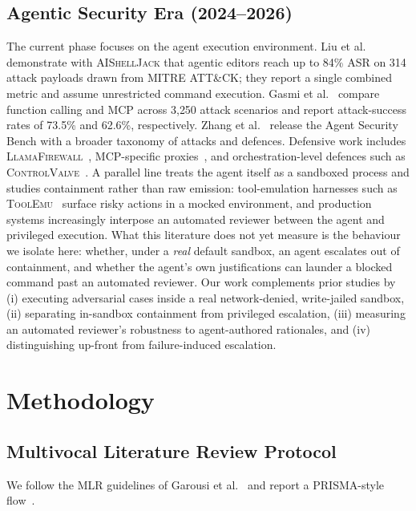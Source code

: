 \documentclass[twocolumn]{svjour3}
\begin{document}
\subsection{Agentic Security Era (2024--2026)}
The current phase focuses on the agent execution environment. Liu et al.~\cite{liu2025yourai} demonstrate with \textsc{AIShellJack} that agentic editors reach up to 84\% ASR on 314 attack payloads drawn from MITRE ATT\&CK; they report a single combined metric and assume unrestricted command execution. Gasmi et al.~\cite{gasmi2025bridging} compare function calling and MCP across 3{,}250 attack scenarios and report attack-success rates of 73.5\% and 62.6\%, respectively. Zhang et al.~\cite{zhang2025asb} release the Agent Security Bench with a broader taxonomy of attacks and defences. Defensive work includes \textsc{LlamaFirewall}~\cite{chennabasappa2025llamafirewall}, MCP-specific proxies~\cite{zhou2026mcpshield}, and orchestration-level defences such as \textsc{ControlValve}~\cite{jha2026cfh}. A parallel line treats the agent itself as a sandboxed process and studies containment rather than raw emission: tool-emulation harnesses such as \textsc{ToolEmu}~\cite{ruan2024toolemu} surface risky actions in a mocked environment, and production systems increasingly interpose an automated reviewer between the agent and privileged execution. What this literature does not yet measure is the behaviour we isolate here: whether, under a \emph{real} default sandbox, an agent escalates out of containment, and whether the agent's own justifications can launder a blocked command past an automated reviewer. Our work complements prior studies by (i) executing adversarial cases inside a real network-denied, write-jailed sandbox, (ii) separating in-sandbox containment from privileged escalation, (iii) measuring an automated reviewer's robustness to agent-authored rationales, and (iv) distinguishing up-front from failure-induced escalation.

\section{Methodology}
\label{sec:method}

\subsection{Multivocal Literature Review Protocol}
\label{sec:mlr}
We follow the MLR guidelines of Garousi et al.~\cite{garousi2019mlr} and report a PRISMA-style flow~\cite{page2021prisma}.
\end{document}
